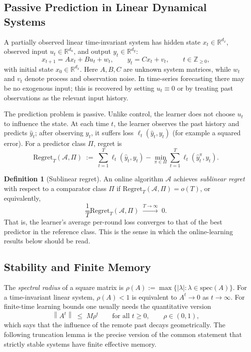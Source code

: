 \documentclass[11pt]{article}
\theoremstyle{plain}
\theoremstyle{definition}
\newtheorem{definition}[theorem]{Definition}
\theoremstyle{remark}
\newcommand{\R}{\mathbb{R}}
\newcommand{\Z}{\mathbb{Z}}
\newcommand{\norm}[1]{\left\lVert#1\right\rVert}
\newcommand{\abs}[1]{\left\lvert#1\right\rvert}
\begin{document}
\subsection{Passive Prediction in Linear Dynamical Systems}
\label{sec:passive-lds}

A partially observed linear time-invariant system has hidden state $x_t \in \R^{d_x}$, observed input $u_t \in \R^{d_u}$, and output $y_t \in \R^{d_y}$:
\begin{equation}
    x_{t+1} = A x_t + B u_t + w_t,
    \qquad y_t = C x_t + v_t,
    \qquad t \in \Z_{\geq 0},
    \label{eq:lds}
\end{equation}
with initial state $x_0 \in \R^{d_x}$. Here $A, B, C$ are unknown system matrices, while $w_t$ and $v_t$ denote process and observation noise. In time-series forecasting there may be no exogenous input; this is recovered by setting $u_t \equiv 0$ or by treating past observations as the relevant input history.

The prediction problem is passive. Unlike control, the learner does not choose $u_t$ to influence the state. At each time $t$, the learner observes the past history and predicts $\hat y_t$; after observing $y_t$, it suffers loss $\ell_t(\hat y_t, y_t)$ (for example a squared error). For a predictor class $\Pi$, regret is
\begin{equation}
    \mathrm{Regret}_T(\mathcal{A}, \Pi) \;:=\; \sum_{t=1}^{T} \ell_t(\hat y_t, y_t) - \min_{\pi \in \Pi} \sum_{t=1}^{T} \ell_t(\hat y_t^{\pi}, y_t).
    \label{eq:prediction-regret}
\end{equation}
\begin{definition}[Sublinear regret]
\label{def:sublinear-regret}
An online algorithm $\mathcal{A}$ achieves \emph{sublinear regret} with respect to a comparator class $\Pi$ if $\mathrm{Regret}_T(\mathcal{A}, \Pi) = o(T)$, or equivalently,
\[
    \frac{1}{T} \mathrm{Regret}_T(\mathcal{A}, \Pi) \;\xrightarrow{T \to \infty}\; 0.
\]
That is, the learner's average per-round loss converges to that of the best predictor in the reference class. This is the sense in which the online-learning results below should be read.
\end{definition}

\subsection{Stability and Finite Memory}
\label{sec:stability-memory}

The \emph{spectral radius} of a square matrix is $\rho(A) := \max\{\abs{\lambda} : \lambda \in \mathrm{spec}(A)\}$. For a time-invariant linear system, $\rho(A) < 1$ is equivalent to $A^t \to 0$ as $t \to \infty$. For finite-time learning bounds one usually needs the quantitative version
\begin{equation}
    \norm{A^t} \;\leq\; M \rho^t \qquad \text{for all } t \geq 0, \qquad \rho \in (0, 1),
    \label{eq:quantitative-stability}
\end{equation}
which says that the influence of the remote past decays geometrically. The following truncation lemma is the precise version of the common statement that strictly stable systems have finite effective memory.
\end{document}
